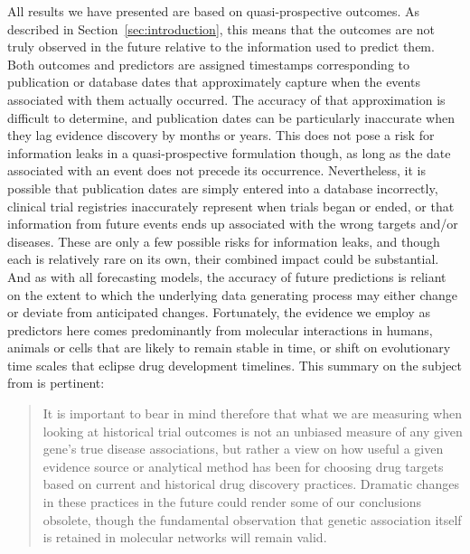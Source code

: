 \documentclass{article}
\begin{document}
All results we have presented are based on quasi-prospective outcomes. As described in Section~\ref{sec:introduction}, this means that the outcomes are not truly observed in the future relative to the information used to predict them. Both outcomes and predictors are assigned timestamps corresponding to publication or database dates that approximately capture when the events associated with them actually occurred. The accuracy of that approximation is difficult to determine, and publication dates can be particularly inaccurate when they lag evidence discovery by months or years. This does not pose a risk for information leaks in a quasi-prospective formulation though, as long as the date associated with an event does not precede its occurrence. Nevertheless, it is possible that publication dates are simply entered into a database incorrectly, clinical trial registries inaccurately represent when trials began or ended, or that information from future events ends up associated with the wrong targets and/or diseases. These are only a few possible risks for information leaks, and though each is relatively rare on its own, their combined impact could be substantial. And as with all forecasting models, the accuracy of future predictions is reliant on the extent to which the underlying data generating process may either change or deviate from anticipated changes. Fortunately, the evidence we employ as predictors here comes predominantly from molecular interactions in humans, animals or cells that are likely to remain stable in time, or shift on evolutionary time scales that eclipse drug development timelines. This summary on the subject from \cite{PMID:33262371} is pertinent:

\begin{quote}
  It is important to bear in mind therefore that what we are measuring when looking at historical trial outcomes is not an unbiased measure of any given gene's true disease associations, but rather a view on how useful a given evidence source or analytical method has been for choosing drug targets based on current and historical drug discovery practices. Dramatic changes in these practices in the future could render some of our conclusions obsolete, though the fundamental observation that genetic association itself is retained in molecular networks will remain valid.
\end{quote}
\end{document}
